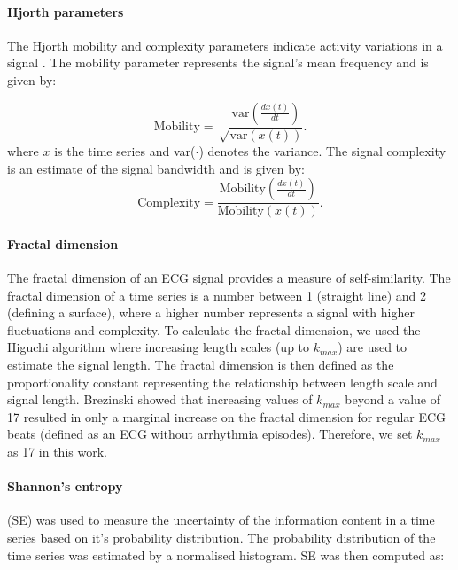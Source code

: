 \documentclass[fleqn,10pt]{wlscirep}
\begin{document}
\paragraph{Hjorth parameters}

The Hjorth mobility and complexity parameters indicate activity variations in a signal \cite{Rizal2015}. The mobility parameter represents the signal's mean frequency and is given by: 

\begin{equation}
\text{Mobility} =\sqrt\frac{{\text{var}(\frac{dx(t)}{dt})}}{\text{var}(x(t))}.
\label{eqn:mobility}
\end{equation}
where $x$ is the time series and var($\cdot$) denotes the variance. The signal complexity is an estimate of the signal bandwidth and is given by:
\begin{equation}
\text{Complexity} =\frac{{\text{Mobility}(\frac{dx(t)}{dt})}}{\text{Mobility}(x(t))}.
\label{eqn:complexity}
\end{equation}

\paragraph{Fractal dimension}

The fractal dimension of an ECG signal provides a measure of self-similarity. The fractal dimension of a time series is a number between 1 (straight line) and 2 (defining a surface), where a higher number represents a signal with higher fluctuations and complexity. To calculate the fractal dimension, we used the Higuchi algorithm \cite{Higuchi1988} where increasing length scales (up to $k_{max}$) are used to estimate the signal length. The fractal dimension is then defined as the proportionality constant representing the relationship between length scale and signal length. Brezinski \cite{Brezinski2019} showed that increasing values of $k_{max}$ beyond a value of 17 resulted in only a marginal increase on the fractal dimension for regular ECG beats (defined as an ECG without arrhythmia episodes). Therefore, we set $k_{max}$ as 17 in this work.


\paragraph{Shannon's entropy}

(SE) was used to measure the uncertainty of the information content in a time series based on it's probability distribution. The probability distribution of the time series was estimated by a normalised histogram. SE was then computed as:
\end{document}
